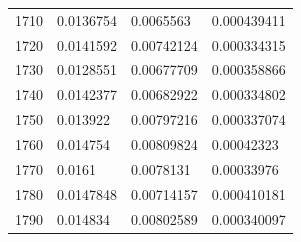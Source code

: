\begin{center}
\begin{longtable}{l|l|l|l}
1710                                                   & 0.0136754                                                         & 0.0065563                                                & 0.000439411                                                        \\
1720                                                   & 0.0141592                                                         & 0.00742124                                               & 0.000334315                                                        \\
1730                                                   & 0.0128551                                                         & 0.00677709                                               & 0.000358866                                                        \\
1740                                                   & 0.0142377                                                         & 0.00682922                                               & 0.000334802                                                        \\
1750                                                   & 0.013922                                                          & 0.00797216                                               & 0.000337074                                                        \\
1760                                                   & 0.014754                                                          & 0.00809824                                               & 0.00042323                                                         \\
1770                                                   & 0.0161                                                            & 0.0078131                                                & 0.00033976                                                         \\
1780                                                   & 0.0147848                                                         & 0.00714157                                               & 0.000410181                                                        \\
1790                                                   & 0.014834                                                          & 0.00802589                                               & 0.000340097                                                        \\

\end{longtable}
\end{center}
